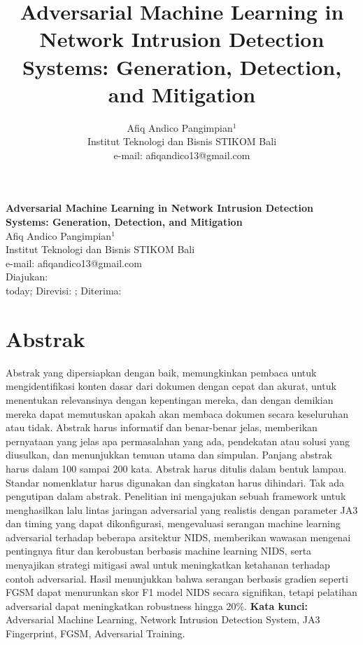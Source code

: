 \documentclass[10pt]{article}
\title{Adversarial Machine Learning in Network Intrusion Detection Systems: Generation, Detection, and Mitigation}
\author{
    Afiq Andico Pangimpian$^1$ \\
    Institut Teknologi dan Bisnis STIKOM Bali \\
    e-mail: afiqandico13@gmail.com
}
\date{} %
\begin{document}
\thispagestyle{empty}
\begin{center}
    {\bfseries \fontsize{16}{19}\selectfont Adversarial Machine Learning in Network Intrusion Detection Systems: Generation, Detection, and Mitigation}\\[1.5ex]
    Afiq Andico Pangimpian$^1$\\[0.5ex]
    Institut Teknologi dan Bisnis STIKOM Bali\\[0.5ex]
    e-mail: afiqandico13@gmail.com\\[2ex]
    Diajukan: \\today; Direvisi: ; Diterima: \\
\end{center}

\vspace{1em}
\section*{Abstrak}
Abstrak yang dipersiapkan dengan baik, memungkinkan pembaca untuk mengidentifikasi konten dasar dari dokumen dengan cepat dan akurat, untuk menentukan relevansinya dengan kepentingan mereka, dan dengan demikian mereka dapat memutuskan apakah akan membaca dokumen secara keseluruhan atau tidak. Abstrak harus informatif dan benar-benar jelas, memberikan pernyataan yang jelas apa permasalahan yang ada, pendekatan atau solusi yang diusulkan, dan menunjukkan temuan utama dan simpulan. Panjang abstrak harus dalam 100 sampai 200 kata. Abstrak harus ditulis dalam bentuk lampau. Standar nomenklatur harus digunakan dan singkatan harus dihindari. Tak ada pengutipan dalam abstrak. Penelitian ini mengajukan sebuah framework untuk menghasilkan lalu lintas jaringan adversarial yang realistis dengan parameter JA3 dan timing yang dapat dikonfigurasi, mengevaluasi serangan machine learning adversarial terhadap beberapa arsitektur NIDS, memberikan wawasan mengenai pentingnya fitur dan kerobustan berbasis machine learning NIDS, serta menyajikan strategi mitigasi awal untuk meningkatkan ketahanan terhadap contoh adversarial. Hasil menunjukkan bahwa serangan berbasis gradien seperti FGSM dapat menurunkan skor F1 model NIDS secara signifikan, tetapi pelatihan adversarial dapat meningkatkan robustness hingga 20\%.
\vspace{0.5em}
\noindent
\textbf{Kata kunci:} Adversarial Machine Learning, Network Intrusion Detection System, JA3 Fingerprint, FGSM, Adversarial Training.
\end{document}
